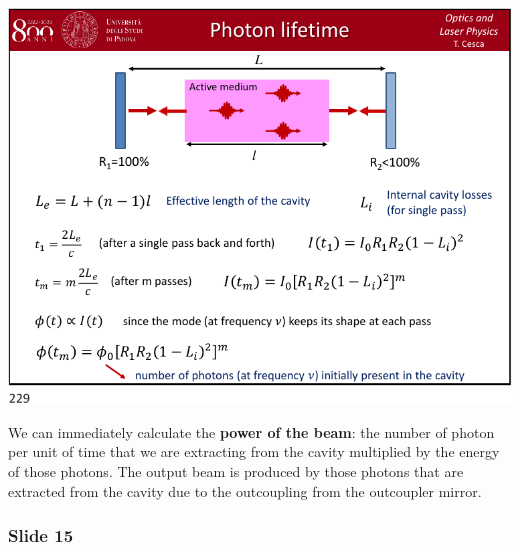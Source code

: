 \documentclass[../main/main.tex]{subfiles}
\begin{document}
\begin{minipage}[]{0.5\linewidth}
\centering
\includegraphics[page=14,width=1\textwidth]{../lessons/pdf_file/12_lecture.pdf}
\end{minipage}
\hspace{0.3cm}\vspace{0.3cm}
\begin{minipage}[c]{0.47\linewidth}

We can immediately calculate the \textbf{power of the beam}: the number of photon per unit of time that we are extracting from the cavity multiplied by the energy of those photons. The output beam is produced by those photons that are extracted from the cavity due to the outcoupling from the outcoupler mirror.

\end{minipage}

\subsubsection*{Slide 15}
\end{document}
